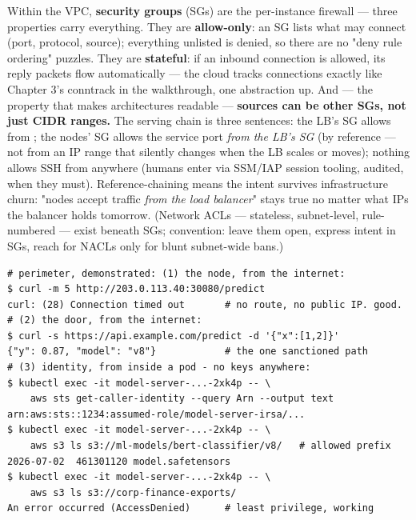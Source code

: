Within the VPC, \textbf{security groups} (SGs) are the per-instance firewall — three properties carry everything. They are \textbf{allow-only}: an SG lists what may connect (port, protocol, source); everything unlisted is denied, so there are no "deny rule ordering" puzzles. They are \textbf{stateful}: if an inbound connection is allowed, its reply packets flow automatically — the cloud tracks connections exactly like Chapter 3's conntrack in the  walkthrough, one abstraction up. And — the property that makes architectures readable — \textbf{sources can be other SGs, not just CIDR ranges.} The serving chain is three sentences: the LB's SG allows  from ; the nodes' SG allows the service port \textit{from the LB's SG} (by reference — not from an IP range that silently changes when the LB scales or moves); nothing allows SSH from anywhere (humans enter via SSM/IAP session tooling, audited, when they must). Reference-chaining means the intent survives infrastructure churn: "nodes accept traffic \textit{from the load balancer}" stays true no matter what IPs the balancer holds tomorrow. (Network ACLs — stateless, subnet-level, rule-numbered — exist beneath SGs; convention: leave them open, express intent in SGs, reach for NACLs only for blunt subnet-wide bans.)

\begin{terminalbox}
\begin{Verbatim}[breaklines=true,breakanywhere=true,fontsize=\small,formatcom=\color{tbbtermfg},codes=\tbbcodeactive]
# perimeter, demonstrated: (1) the node, from the internet:
$ curl -m 5 http://203.0.113.40:30080/predict
curl: (28) Connection timed out       # no route, no public IP. good.
# (2) the door, from the internet:
$ curl -s https://api.example.com/predict -d '{"x":[1,2]}'
{"y": 0.87, "model": "v8"}            # the one sanctioned path
# (3) identity, from inside a pod - no keys anywhere:
$ kubectl exec -it model-server-...-2xk4p -- \
    aws sts get-caller-identity --query Arn --output text
arn:aws:sts::1234:assumed-role/model-server-irsa/...
$ kubectl exec -it model-server-...-2xk4p -- \
    aws s3 ls s3://ml-models/bert-classifier/v8/   # allowed prefix
2026-07-02  461301120 model.safetensors
$ kubectl exec -it model-server-...-2xk4p -- \
    aws s3 ls s3://corp-finance-exports/
An error occurred (AccessDenied)      # least privilege, working
\end{Verbatim}
\end{terminalbox}

